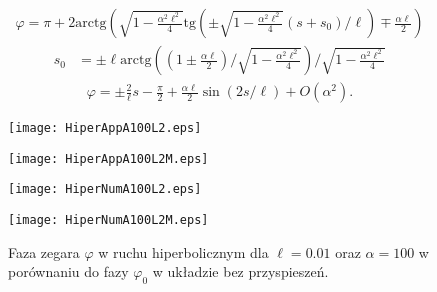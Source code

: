 \begin{align}\label{phi_wynik_jednostajnie}
\varphi = \pi + 
2\text{arctg} \left( 
\sqrt{1-\frac{\alpha^2\ell^2}{4}} 
\text{tg} \left( \pm 
\sqrt{1-\frac{\alpha^2\ell^2}{4}} 
(s + s_0)/\ell\right)  \mp \frac{\alpha \ell}{2}
\right)
\end{align}
\begin{align*}
s_0 & = \pm \ell \text{arctg}  
\left( \left(1 \pm\frac{\alpha\ell}{2}\right) \Big / 
\sqrt{1-\frac{\alpha^2\ell^2}{4}}  \right)
\Big /\sqrt{1-\frac{\alpha^2\ell^2}{4}}
\end{align*}
\begin{align}\label{phi_szereg_jednostajnie}
\varphi =  \pm \frac{2}{\ell}s - \frac{\pi}{2} 
+ \frac{\alpha \ell}{2}  \sin (2 s / \ell  )  
+O(\alpha^2).
\end{align}
\begin{figure}
\begin{minipage}[b]{.5\linewidth}
\centering
\texttt{[image: HiperAppA100L2.eps]}
\label{fig:1a}
\end{minipage}%
\begin{minipage}[b]{.5\linewidth}
\centering
\texttt{[image: HiperAppA100L2M.eps]}
\label{fig:1b}
\end{minipage}
\begin{minipage}[b]{.5\linewidth}
\centering
\texttt{[image: HiperNumA100L2.eps]}
\label{fig:1c}
\end{minipage}%
\begin{minipage}[b]{.5\linewidth}
\centering
\texttt{[image: HiperNumA100L2M.eps]}
\label{fig:1d}
\end{minipage}
\caption{Faza zegara $\varphi$ w ruchu hiperbolicznym dla 
$\ell=0.01$ oraz $\alpha=100$ w porównaniu do fazy 
$\varphi_0$ w układzie bez przyspieszeń. }\label{fig:1}
\end{figure}

